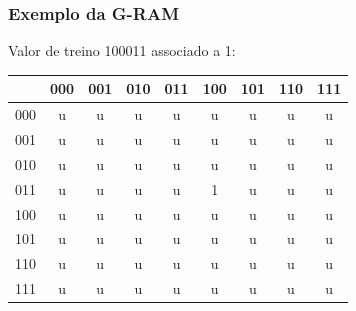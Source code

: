 \documentclass{beamer}
\begin{document}
\begin{frame}
    \frametitle{Exemplo da G-RAM}
    Valor de treino 100011 associado a 1:

    \begin{table}
        \centering
        \begin{tabular}{|c|c|c|c|c|c|c|c|c|}
            \hline
                & 000 & 001 & 010 & 011 & 100 & 101 & 110 & 111\\
            \hline
            000 &  u  &  u  &  u  &  u  &  u  &  u  &  u  &  u \\
            \hline
            001 &  u  &  u  &  u  &  u  &  u  &  u  &  u  &  u \\
            \hline
            010 &  u  &  u  &  u  &  u  &  u  &  u  &  u  &  u \\
            \hline
            011 &  u  &  u  &  u  &  u  &  \alert 1  &  u  &  u  &  u \\
            \hline
            100 &  u  &  u  &  u  &  u  &  u  &  u  &  u  &  u \\
            \hline
            101 &  u  &  u  &  u  &  u  &  u  &  u  &  u  &  u \\
            \hline
            110 &  u  &  u  &  u  &  u  &  u  &  u  &  u  &  u \\
            \hline
            111 &  u  &  u  &  u  &  u  &  u  &  u  &  u  &  u \\
            \hline

        \end{tabular}
    \end{table}
\end{frame}
\end{document}
